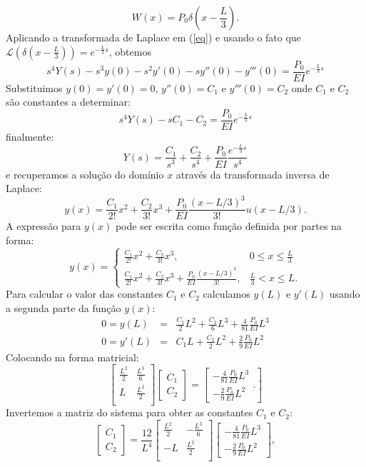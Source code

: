 $$W(x)=P_0\delta\left(x-\frac{L}{3}\right).$$
Aplicando a transformada de Laplace em (\ref{eq}) e usando o fato que $\mathcal{L}\left(\delta\left(x-\frac{L}{3}\right)\right)=e^{-\frac{L}{3}s}$, obtemos
$$s^4Y(s)-s^3y(0)-s^2y'(0)-sy''(0)-y'''(0)=\frac{P_0}{EI}e^{-\frac{L}{3}s}$$
Substituimos $y(0)=y'(0)=0$, $y''(0)=C_1$ e $y'''(0)=C_2$ onde $C_1$ e $C_2$ são constantes a determinar:
$$s^4Y(s)-sC_1-C_2=\frac{P_0}{EI}e^{-\frac{L}{3}s}$$
finalmente:
$$Y(s)=\frac{C_1}{s^3}+\frac{C_2}{s^4}+\frac{P_0}{EI}\frac{e^{-\frac{L}{3}s}}{s^4}$$
e recuperamos a solução do domínio $x$ através da transformada inversa de Laplace:
$$y(x)=\frac{C_1}{2!}x^2+\frac{C_2}{3!}x^3+\frac{P_0}{EI}\frac{(x-L/3)^3}{3!}u(x-L/3).$$
A expressão para $y(x)$ pode ser escrita como função definida por partes na forma:
$$y(x)=\left\{\begin{array}{ll}\frac{C_1}{2!}x^2+\frac{C_2}{3!}x^3,&0\leq x\leq\frac{L}{3} \\ \frac{C_1}{2!}x^2+\frac{C_2}{3!}x^3+\frac{P_0}{EI}\frac{(x-L/3)^3}{3!},&\frac{L}{3}<x\leq L .\end{array}\right.$$
Para calcular o valor das constantes $C_1$ e $C_2$ calculamos  $y(L)$ e $y'(L)$ usando a segunda parte da função $y(x)$:
\begin{eqnarray*}
0=y(L)&=&\frac{C_1}{2}L^2+\frac{C_2}{6}L^3+\frac{4}{81}\frac{P_0}{EI}L^3\\
0=y'(L)&=&C_1 L+\frac{C_2}{2}L^2+\frac{2}{9}\frac{P_0}{EI}L^2
\end{eqnarray*}
Colocando na forma matricial:
$$\left[\begin{array}{cc}
\frac{L^2}{2} & \frac{L^3}{6}\\
L & \frac{L^2}{2}\\
\end{array}
\right]\left[\begin{array}{c}
C_1\\
C_2\end{array}
\right]=\left[\begin{array}{c}
-\frac{4}{81}\frac{P_0}{EI}L^3\\
-\frac{2}{9}\frac{P_0}{EI}L^2\end{array}.
\right]
$$
 Invertemos a matriz do sistema para obter as constantes $C_1$ e $C_2$:
$$\left[\begin{array}{c}
C_1\\
C_2\end{array}
\right]=
\frac{12}{L^4}
\left[\begin{array}{cc}
\frac{L^2}{2} & -\frac{L^3}{6}\\
-L & \frac{L^2}{2}\\
\end{array}
\right]\left[\begin{array}{c}
-\frac{4}{81}\frac{P_0}{EI}L^3\\
-\frac{2}{9}\frac{P_0}{EI}L^2\end{array}
\right],
$$

